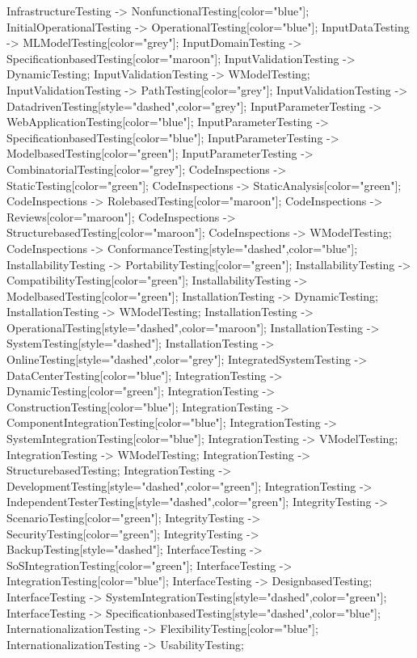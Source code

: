 \documentclass{article}
\begin{document}
{InfrastructureTesting -> NonfunctionalTesting[color="blue"];
InitialOperationalTesting -> OperationalTesting[color="blue"];
InputDataTesting -> MLModelTesting[color="grey"];
InputDomainTesting -> SpecificationbasedTesting[color="maroon"];
InputValidationTesting -> DynamicTesting;
InputValidationTesting -> WModelTesting;
InputValidationTesting -> PathTesting[color="grey"];
InputValidationTesting -> DatadrivenTesting[style="dashed",color="grey"];
InputParameterTesting -> WebApplicationTesting[color="blue"];
InputParameterTesting -> SpecificationbasedTesting[color="blue"];
InputParameterTesting -> ModelbasedTesting[color="green"];
InputParameterTesting -> CombinatorialTesting[color="grey"];
CodeInspections -> StaticTesting[color="green"];
CodeInspections -> StaticAnalysis[color="green"];
CodeInspections -> RolebasedTesting[color="maroon"];
CodeInspections -> Reviews[color="maroon"];
CodeInspections -> StructurebasedTesting[color="maroon"];
CodeInspections -> WModelTesting;
CodeInspections -> ConformanceTesting[style="dashed",color="blue"];
InstallabilityTesting -> PortabilityTesting[color="green"];
InstallabilityTesting -> CompatibilityTesting[color="green"];
InstallabilityTesting -> ModelbasedTesting[color="green"];
InstallationTesting -> DynamicTesting;
InstallationTesting -> WModelTesting;
InstallationTesting -> OperationalTesting[style="dashed",color="maroon"];
InstallationTesting -> SystemTesting[style="dashed"];
InstallationTesting -> OnlineTesting[style="dashed",color="grey"];
IntegratedSystemTesting -> DataCenterTesting[color="blue"];
IntegrationTesting -> DynamicTesting[color="green"];
IntegrationTesting -> ConstructionTesting[color="blue"];
IntegrationTesting -> ComponentIntegrationTesting[color="blue"];
IntegrationTesting -> SystemIntegrationTesting[color="blue"];
IntegrationTesting -> VModelTesting;
IntegrationTesting -> WModelTesting;
IntegrationTesting -> StructurebasedTesting;
IntegrationTesting -> DevelopmentTesting[style="dashed",color="green"];
IntegrationTesting -> IndependentTesterTesting[style="dashed",color="green"];
IntegrityTesting -> ScenarioTesting[color="green"];
IntegrityTesting -> SecurityTesting[color="green"];
IntegrityTesting -> BackupTesting[style="dashed"];
InterfaceTesting -> SoSIntegrationTesting[color="green"];
InterfaceTesting -> IntegrationTesting[color="blue"];
InterfaceTesting -> DesignbasedTesting;
InterfaceTesting -> SystemIntegrationTesting[style="dashed",color="green"];
InterfaceTesting -> SpecificationbasedTesting[style="dashed",color="blue"];
InternationalizationTesting -> FlexibilityTesting[color="blue"];
InternationalizationTesting -> UsabilityTesting;
}
\end{document}
